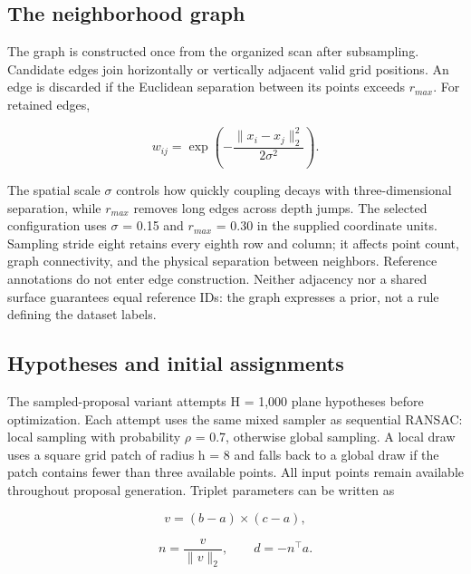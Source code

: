\subsection{The neighborhood graph}\label{the-neighborhood-graph}

The graph is constructed once from the organized scan after subsampling. Candidate edges join horizontally or vertically adjacent valid grid positions. An edge is discarded if the Euclidean separation between its points exceeds \(r_{max}\). For retained edges,

\begin{equation}
w_{ij}=\exp\!\left(-\frac{\|x_i-x_j\|_2^2}{2\sigma^2}\right).
\label{eq:18}
\end{equation}

The spatial scale \(\sigma\) controls how quickly coupling decays with three-dimensional separation, while \(r_{max}\) removes long edges across depth jumps. The selected configuration uses \(\sigma\) = 0.15 and \(r_{max}\) = 0.30 in the supplied coordinate units. Sampling stride eight retains every eighth row and column; it affects point count, graph connectivity, and the physical separation between neighbors. Reference annotations do not enter edge construction. Neither adjacency nor a shared surface guarantees equal reference IDs: the graph expresses a prior, not a rule defining the dataset labels.

\subsection{Hypotheses and initial assignments}\label{hypotheses-and-initial-assignments}

The sampled-proposal variant attempts H = 1,000 plane hypotheses before optimization. Each attempt uses the same mixed sampler as sequential RANSAC: local sampling with probability \(\rho\) = 0.7, otherwise global sampling. A local draw uses a square grid patch of radius h = 8 and falls back to a global draw if the patch contains fewer than three available points. All input points remain available throughout proposal generation. Triplet parameters can be written as

\begin{equation}
v=(b-a)\times(c-a),
\label{eq:19}
\end{equation}

\begin{equation}
n=\frac{v}{\|v\|_2},\qquad d=-n^\top a.
\label{eq:20}
\end{equation}

